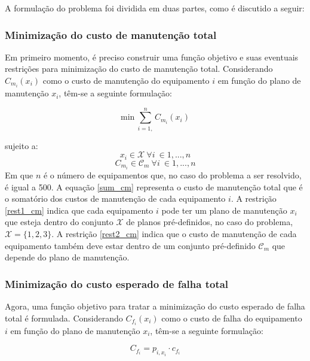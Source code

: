 A formulação do problema foi dividida em duas partes, como é discutido a seguir:

\subsubsection{Minimização do custo de manutenção total} Em primeiro
momento, é preciso construir uma função objetivo e suas eventuais restrições para minimização do custo de manutenção total. Considerando $C_{m_i}(x_i)$ como o custo de manutenção do equipamento $i$ em função do plano de manutenção $x_i$, têm-se a seguinte formulação:

\begin{equation}
\mathrm{min}\ \sum_{i=1,}^{n} C_{m_i} (x_i) 
\label{sum_cm}
\end{equation}

sujeito a:
\begin{equation}
x_i \in \mathcal{X}\ \forall i\ \in 1, ..., n
\label{rest1_cm}
\end{equation}
\begin{equation}
C_{m_i} \in \mathcal{C}_{m}\ \forall i\ \in 1, ..., n
\label{rest2_cm}
\end{equation}
Em que $n$ é o número de equipamentos que, no caso do problema a ser resolvido, é igual a 500. A equação \ref{sum_cm} representa o custo de manutenção total que é o somatório dos custos de manutenção de cada equipamento $i$. A restrição \ref{rest1_cm} indica que cada equipamento $i$ pode ter um plano de manutenção $x_i$ que esteja dentro do conjunto $\mathcal{X}$ de planos pré-definidos, no caso do problema, $\mathcal{X} = \{1,2,3\}$. A restrição \ref{rest2_cm} indica que o custo de manutenção de cada equipamento também deve estar dentro de um conjunto pré-definido $\mathcal{C}_{m}$ que depende do plano de manutenção.

\subsubsection{Minimização do custo esperado de falha total} Agora, uma função objetivo para tratar a minimização do custo esperado de falha total é formulada. Considerando $C_{f_i}(x_i)$ como o custo de falha do equipamento $i$ em função do plano de manutenção $x_i$, têm-se a seguinte formulação:

\begin{equation}
C_{f_i} = p_{i,x_i} \cdot c_{f_i}
\label{cf}
\end{equation}

